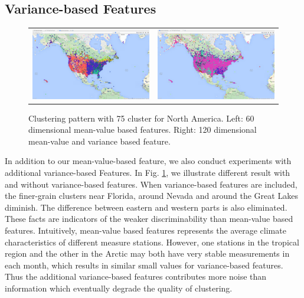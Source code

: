\subsection{Variance-based Features}
\begin{figure}
    \centering
    \begin{tabular}{c c}
        \includegraphics[width=.45\linewidth]{./figure/Ave_60_comp_75_clu_USA.png}
        & \includegraphics[width=.45\linewidth]{./figure/Var_120_comp_75_clu_USA.png}
    \end{tabular}
    \caption{Clustering pattern with 75 cluster for North America. Left: 60 dimensional mean-value based features. Right: 120 dimensional mean-value and variance based feature.}
    \label{fig:VarFeature}
\end{figure}
In addition to our mean-value-based feature, we also conduct experiments with additional variance-based Features. In Fig. \ref{fig:VarFeature}, we illustrate different result with and without variance-based features. When variance-based features are included, the finer-grain clusters near Florida, around Nevada and around the Great Lakes diminish. The difference between eastern and western parts is also eliminated. These facts are indicators of the weaker discriminability than mean-value based features. Intuitively, mean-value based features represents the average climate characteristics of different measure stations. However, one stations in the tropical region and the other in the Arctic may both have very stable measurements in each month, which results in similar small values for variance-based features. Thus the additional variance-based features contributes more noise than information which eventually degrade the quality of clustering.

